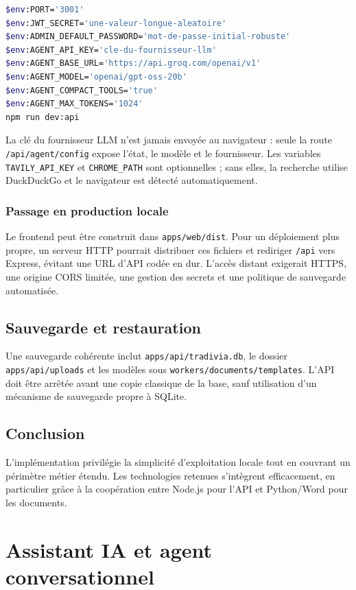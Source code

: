\documentclass[12pt,a4paper,oneside]{report}
\newcommand{\code}[1]{\texttt{#1}}
\begin{document}
\begin{lstlisting}[language=bash,caption={Exemple de configuration PowerShell}]
$env:PORT='3001'
$env:JWT_SECRET='une-valeur-longue-aleatoire'
$env:ADMIN_DEFAULT_PASSWORD='mot-de-passe-initial-robuste'
$env:AGENT_API_KEY='cle-du-fournisseur-llm'
$env:AGENT_BASE_URL='https://api.groq.com/openai/v1'
$env:AGENT_MODEL='openai/gpt-oss-20b'
$env:AGENT_COMPACT_TOOLS='true'
$env:AGENT_MAX_TOKENS='1024'
npm run dev:api
\end{lstlisting}
La clé du fournisseur LLM n'est jamais envoyée au navigateur : seule la route \code{/api/agent/config} expose l'état, le modèle et le fournisseur. Les variables \code{TAVILY\_API\_KEY} et \code{CHROME\_PATH} sont optionnelles ; sans elles, la recherche utilise DuckDuckGo et le navigateur est détecté automatiquement.

\subsection{Passage en production locale}
Le frontend peut être construit dans \code{apps/web/dist}. Pour un déploiement plus propre, un serveur HTTP pourrait distribuer ces fichiers et rediriger \code{/api} vers Express, évitant une URL d'API codée en dur. L'accès distant exigerait HTTPS, une origine CORS limitée, une gestion des secrets et une politique de sauvegarde automatisée.

\section{Sauvegarde et restauration}
Une sauvegarde cohérente inclut \code{apps/api/tradivia.db}, le dossier \code{apps/api/uploads} et les modèles sous \code{workers/documents/templates}. L'API doit être arrêtée avant une copie classique de la base, sauf utilisation d'un mécanisme de sauvegarde propre à SQLite.

\section*{Conclusion}
L'implémentation privilégie la simplicité d'exploitation locale tout en couvrant un périmètre métier étendu. Les technologies retenues s'intègrent efficacement, en particulier grâce à la coopération entre Node.js pour l'API et Python/Word pour les documents.

\chapter{Assistant IA et agent conversationnel}
\label{chap:agent}
\end{document}
